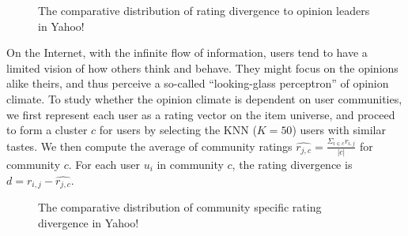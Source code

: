 \documentclass[sigconf]{acmart}
\begin{document}
\begin{figure}[htbp]
\centering
\centering
{}
\caption{The comparative distribution of rating divergence to opinion leaders in Yahoo!}\label{fig:leader}
\end{figure}

On the Internet, with the infinite flow of information, users tend to have a limited vision of how others think and behave. They might focus on the opinions alike theirs, and thus perceive a so-called ``looking-glass perceptron'' of opinion climate. To study whether the opinion climate is dependent on user communities, we first represent each user as a rating vector on the item universe, and proceed to form a cluster $c$ for users by selecting the KNN ($K=50$) users with similar tastes.  We then compute the average of community ratings $\hat{r_{j,c}}=\frac{\Sigma_{i\in c}r_{i,j}}{|c|}$ for community $c$. For each user $u_i$ in community $c$, the rating divergence is   $d=r_{i,j}-\hat{r_{j,c}}$.

\begin{figure}[htbp]
\centering
\centering
{}
\caption{The comparative  distribution of community specific rating divergence in Yahoo!}\label{fig:community}
\end{figure}
\end{document}
